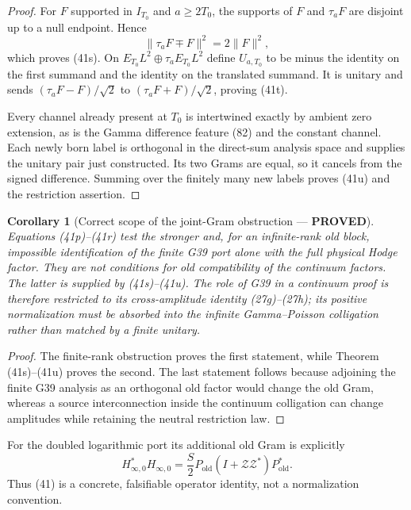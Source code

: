 \documentclass[11pt]{article}
\newtheorem{corollary}[theorem]{Corollary}
\newcommand{\PROVED}{\textcolor{green!45!black}{\textbf{PROVED}}}
\newcommand{\old}{\mathrm{old}}
\newcommand{\cZ}{\mathscr Z}
\begin{document}
\begin{proof}
For $F$ supported in $I_{T_0}$ and $a\ge2T_0$, the supports of $F$ and
$\tau_aF$ are disjoint up to a null endpoint.  Hence
\[
 \|\tau_aF\mp F\|^2=2\|F\|^2,
\]
which proves (41s).  On
$E_{T_0}L^2\oplus\tau_aE_{T_0}L^2$ define $U_{a,T_0}$ to be minus the
identity on the first summand and the identity on the translated summand.
It is unitary and sends
$(\tau_aF-F)/\sqrt2$ to $(\tau_aF+F)/\sqrt2$, proving (41t).

Every channel already present at $T_0$ is intertwined exactly by ambient
zero extension, as is the Gamma difference feature (82) and the constant
channel.  Each newly born label is orthogonal in the direct-sum analysis
space and supplies the unitary pair just constructed.  Its two Grams are
equal, so it cancels from the signed difference.  Summing over the finitely
many new labels proves (41u) and the restriction assertion.
\end{proof}

\begin{corollary}[Correct scope of the joint-Gram obstruction --- \PROVED]
Equations (41p)--(41r) test the stronger and, for an infinite-rank old block,
impossible identification of the \emph{finite G39 port alone} with the full
physical Hodge factor.  They are not conditions for old compatibility of
the continuum factors.  The latter is supplied by (41s)--(41u).  The role of
G39 in a continuum proof is therefore restricted to its cross-amplitude
identity (27g)--(27h); its positive normalization must be absorbed into the
infinite Gamma--Poisson colligation rather than matched by a finite unitary.
\end{corollary}

\begin{proof}
The finite-rank obstruction proves the first statement, while Theorem
(41s)--(41u) proves the second.  The last statement follows because adjoining
the finite G39 analysis as an orthogonal old factor would change the old
Gram, whereas a source interconnection inside the continuum colligation can
change amplitudes while retaining the neutral restriction law.
\end{proof}

For the doubled logarithmic port its additional old Gram is explicitly
\begin{equation}
 H_{\infty,0}^*H_{\infty,0}
 =\frac S2P_{\old}(I+\cZ\cZ^*)P_{\old}^*.               \tag{42}
\end{equation}
Thus (41) is a concrete, falsifiable operator identity, not a normalization
convention.
\end{document}
